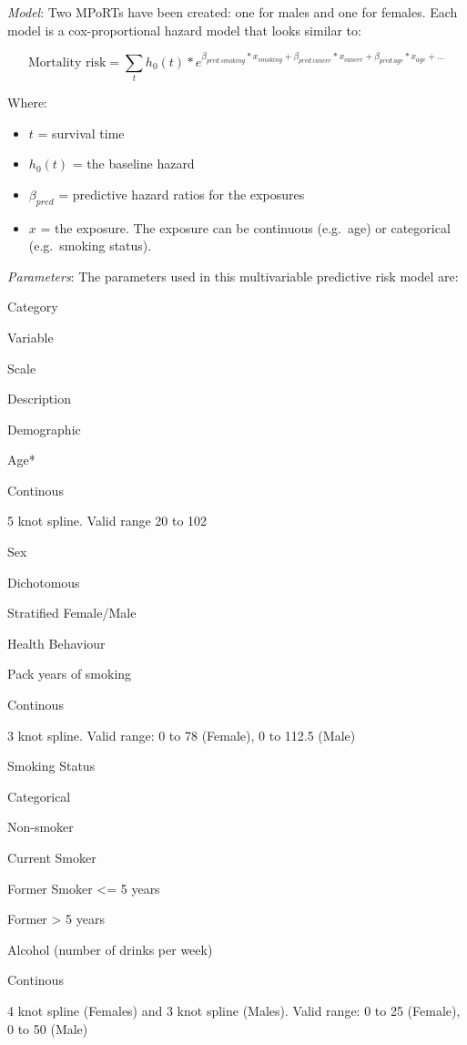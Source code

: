 \documentclass[]{book}
\providecommand{\tightlist}{%
  \setlength{\itemsep}{0pt}\setlength{\parskip}{0pt}}
\begin{document}
\emph{Model}: Two MPoRTs have been created: one for males and one for females. Each model is a cox-proportional hazard model that looks similar to:

\[ \text{Mortality risk} = \sum_t h_0(t) * e^{\beta_{pred.smoking}*x_{smoking}+\beta_{pred.cancer}*x_{cancer} + \beta_{pred.age}*x_{age} +...}  \]

Where:

\begin{itemize}
\tightlist
\item
  \(t\) = survival time
\item
  \(h_0(t)\) = the baseline hazard
\item
  \(\beta_{pred}\) = predictive hazard ratios for the exposures
\item
  \(x\) = the exposure. The exposure can be continuous (e.g.~age) or categorical (e.g.~smoking status).
\end{itemize}

\emph{Parameters}: The parameters used in this multivariable predictive risk model are:

Category

Variable

Scale

Description

Demographic

Age*

Continous

5 knot spline. Valid range 20 to 102

Sex

Dichotomous

Stratified Female/Male

Health Behaviour

Pack years of smoking

Continous

3 knot spline. Valid range: 0 to 78 (Female), 0 to 112.5 (Male)

Smoking Status

Categorical

Non-smoker

Current Smoker

Former Smoker \textless{}= 5 years

Former \textgreater{} 5 years

Alcohol (number of drinks per week)

Continous

4 knot spline (Females) and 3 knot spline (Males). Valid range: 0 to 25 (Female), 0 to 50 (Male)
\end{document}
